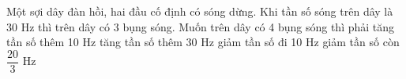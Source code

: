 \begin{vidu}%
Một sợi dây đàn hồi, hai đầu cố định có sóng dừng. Khi tần số sóng trên dây là 30 Hz thì trên dây có 3 bụng sóng. Muốn trên dây có 4 bụng sóng thì phải
\choice
{\True tăng tần số thêm 10 Hz}
{tăng tần số thêm 30 Hz}
{giảm tần số đi 10 Hz}
{giảm tần số còn $\dfrac{20}{3}$ Hz}
\end{vidu} 

